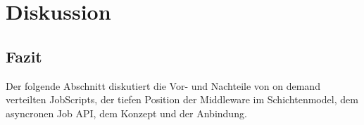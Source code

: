 
\chapter{Diskussion}
\label{K6}

\section{Fazit}
Der folgende Abschnitt diskutiert die Vor- und Nachteile von
on demand verteilten JobScripts,
der tiefen Position der Middleware im Schichtenmodel,
dem asyncronen Job API,
dem \JobTree{} Konzept
und der \UI{} Anbindung.


